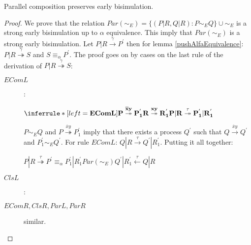 \begin{lemma}
  Parallel composition preserves early bisimulation.
  \begin{proof}
    We prove that the relation $Par(\sim_{E})=\{(P|R, Q|R): P\sim_{E} Q\} \cup \sim_{E}$ is a strong early bisimulation up to $\alpha$ equivalence. This imply that $Par(\sim_{E})$ is a strong early bisimulation. Let $P|R \xrightarrow{\gamma} P^{'}$ then for lemma \ref{pushAlfaEquivalence}: $P|R \stackrel{\gamma}{\twoheadrightarrow} S$ and $S\equiv_{\alpha} P^{'}$. The proof goes on by cases on the last rule of the derivation of $P|R \stackrel{\gamma}{\twoheadrightarrow} S$:
    \begin{description}
      \item[$EComL$]:
	    \begin{center}
	      $\inferrule* [left=\bf{EComL}]{
		      P \stackrel{\overline{x}y}{\twoheadrightarrow} P_{1}^{'}
		    \\
		      R \stackrel{xy}{\twoheadrightarrow} R_{1}^{'}
		  }{
		    P|R \stackrel{\tau}{\twoheadrightarrow} P_{1}^{'}|R_{1}^{'}
		  }$
	    \end{center}
	$P\sim_{E} Q$ and $P \stackrel{\overline{x}y}{\twoheadrightarrow} P_{1}^{'}$ imply that there exists a process $Q^{'}$ such that $Q \xrightarrow{\overline{x}y} Q^{'}$ and $P_{1}^{'}\sim_{E} Q^{'}$. For rule $EComL$: $Q|R \xrightarrow{\tau} Q^{'}|R_{1}^{'}$. Putting it all together:
	\begin{center}
	  $P|R \stackrel{\tau}{\twoheadrightarrow} P^{'} \equiv_{\alpha} P_{1}^{'}|R_{1}^{'} Par(\sim_{E}) Q^{'}|R_{1}^{'} \stackrel{\tau}{\leftarrow} Q|R$
	\end{center}
      \item[$ClsL$]:
      \item[$EComR, ClsR, ParL, ParR$] similar.
    \end{description}
  \end{proof}
\end{lemma}


